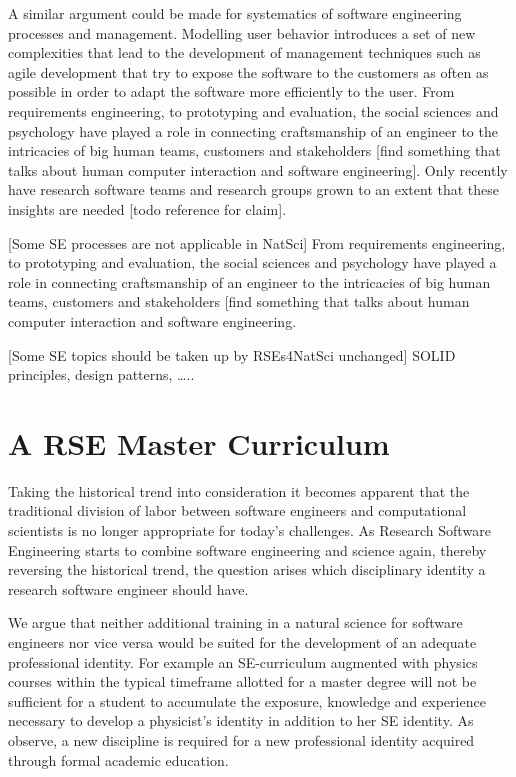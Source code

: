 \documentclass[
        twocolumn,german,biblatex
    ]{article}
\begin{document}
    A similar argument could be made for systematics of software
    engineering processes and management. Modelling user behavior
    introduces a set of new complexities that lead to the development of
    management techniques such as agile development that try to expose
    the software to the customers as often as possible in order to adapt
    the software more efficiently to the user. From requirements
    engineering, to prototyping and evaluation, the social sciences and
    psychology have played a role in connecting craftsmanship of an
    engineer to the intricacies of big human teams, customers and
    stakeholders {[}find something that talks about human computer
    interaction and software engineering{]}. Only recently have research
    software teams and research groups grown to an extent that these
    insights are needed {[}todo reference for claim{]}.

    {[}Some SE processes are not applicable in NatSci{]} From
    requirements engineering, to prototyping and evaluation, the social
    sciences and psychology have played a role in connecting
    craftsmanship of an engineer to the intricacies of big human teams,
    customers and stakeholders {[}find something that talks about human
    computer interaction and software engineering.

    {[}Some SE topics should be taken up by RSEs4NatSci unchanged{]}
    SOLID principles, design patterns, \ldots..

    \section{A RSE Master Curriculum}\label{a-rse-master-curriculum}

    Taking the historical trend into consideration it becomes apparent
    that the traditional division of labor between software engineers
    and computational scientists is no longer appropriate for today's
    challenges. As Research Software Engineering starts to combine
    software engineering and science again, thereby reversing the
    historical trend, the question arises which disciplinary identity a
    research software engineer should have.

    We argue that neither additional training in a natural science for
    software engineers nor vice versa would be suited for the
    development of an adequate professional identity. For example an
    SE-curriculum augmented with physics courses within the typical
    timeframe allotted for a master degree will not be sufficient for a
    student to accumulate the exposure, knowledge and experience
    necessary to develop a physicist's identity in addition to her SE
    identity. As \textcite{gomez2025} observe, a new discipline is
    required for a new professional identity acquired through formal
    academic education.
\end{document}
